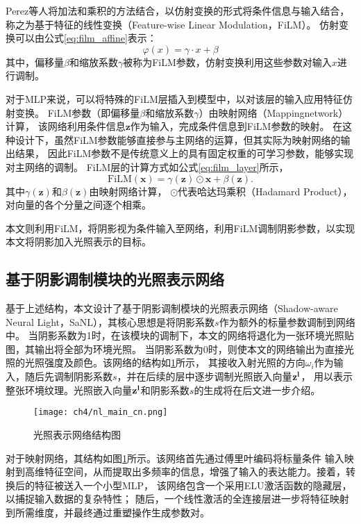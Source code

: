 Perez等人\cite{Perez_2018}将加法和乘积的方法结合，以仿射变换的形式将条件信息与输入结合，
称之为基于特征的线性变换（Feature-wise Linear Modulation，FiLM）。
仿射变换可以由公式\eqref{eq:film_affine}表示：
\begin{equation}
\label{eq:film_affine}
\varphi(x)=\gamma\cdot x+\beta
\end{equation}
其中，偏移量$\beta$和缩放系数$\gamma$被称为FiLM参数，仿射变换利用这些参数对输入$x$进行调制。

对于MLP来说，可以将特殊的FiLM层插入到模型中，以对该层的输入应用特征仿射变换。
FiLM参数（即偏移量$\beta$和缩放系数$\gamma$）由映射网络（Mappingnetwork）计算，
该网络利用条件信息$\mathbf{z}$作为输入，完成条件信息到FiLM参数的映射。
在这种设计下，虽然FiLM参数能够直接参与主网络的运算，但其实际为映射网络的输出结果，
因此FiLM参数不是传统意义上的具有固定权重的可学习参数，能够实现对主网络的调制。
FiLM层的计算方式如公式\eqref{eq:film_layer}所示，
\begin{equation}
\label{eq:film_layer}
\mathrm{FiLM}(\mathbf{x})=\gamma(\mathbf{z})\odot \mathbf{x}+\beta(\mathbf{z}).
\end{equation}
其中$\gamma(\mathbf{z})$和$\beta(\mathbf{z})$由映射网络计算，
$\odot$代表哈达玛乘积（Hadamard Product），对向量的各个分量之间逐个相乘。

本文则利用FiLM，将阴影视为条件输入至网络，利用FiLM调制阴影参数，以实现本文将阴影加入光照表示的目标。

\subsection{基于阴影调制模块的光照表示网络}

基于上述结构，本文设计了基于阴影调制模块的光照表示网络（Shadow-aware Neural Light，SaNL），其核心思想是将阴影系数$s$作为额外的标量参数调制到网络中。
当阴影系数为1时，在该模块的调制下，本文的网络将退化为一张环境光照贴图，其输出将全部为环境光照。
当阴影系数为0时，则使本文的网络输出为直接光照的光照强度及颜色。该网络的结构如\ref{fig:nl_main_cn}所示，
其接收入射光照的方向$\omega_i$作为输入，随后先调制阴影系数$s$，并在后续的层中逐步调制光照嵌入向量$\bf{z}^l$，
用以表示整张环境纹理。光照嵌入向量$\bf{z}^l$和阴影系数$s$的生成将在后文进一步介绍。

\begin{figure}[htb]
  \centering
  \texttt{[image: ch4/nl\_main\_cn.png]}
  \caption{光照表示网络结构图}
  \label{fig:nl_main_cn}
\end{figure}

对于映射网络，其结构如图\ref{fig:nl_main_cn}所示。该网络首先通过傅里叶编码将标量条件
输入映射到高维特征空间，从而提取出多频率的信息，增强了输入的表达能力。接着，转换后的特征被送入一个小型MLP，
该网络包含一个采用ELU激活函数的隐藏层，以捕捉输入数据的复杂特性；
随后，一个线性激活的全连接层进一步将特征映射到所需维度，并最终通过重塑操作生成参数对。

